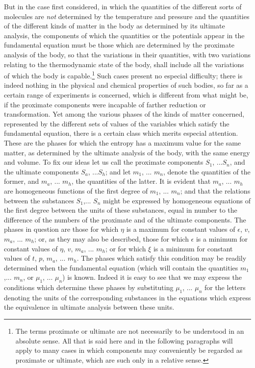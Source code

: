 \documentclass[12pt]{memoir}
\begin{document}
But in the case first considered, in which the quantities of the different sorts of molecules are \textit{not} determined by the temperature and pressure and the quantities of the different kinds of matter in the body as determined by its ultimate analysis, the components of which the quantities or the potentials appear in the fundamental equation must be those which are determined by the proximate analysis of the body, so that the variations in their quantities, with two variations relating to the thermodynamic state of the body, shall include all the variations of which the body is capable.\footnote{The terms proximate or ultimate are not necessarily to be understood in an absolute sense. All that is said here and in the following paragraphs will apply to many cases in which components may conveniently be regarded as proximate or ultimate, which are such only in a relative sense.} Such cases present no especial difficulty; there is indeed nothing in the physical and chemical properties of such bodies, so far as a certain range of experiments is concerned, which is different from what might be, if the proximate components were incapable of farther reduction or transformation. Yet among the various phases of the kinds of matter concerned, represented by the different sets of values of the variables which satisfy the fundamental equation, there is a certain class which merits especial attention. These are the phases for which the entropy has a maximum value for the same matter, as determined by the ultimate analysis of the body, with the same energy and volume. To fix our ideas let us call the proximate components $S_1$, ...$S_n$, and the ultimate components $S_a$, ...$S_h$; and let $m_1$, ... $m_n$, denote the quantities of the former, and $m_a$, ... $m_h$, the quantities of the latter. It is evident that $m_a$, ... $m_h$ are homogeneous functions of the first degree of $m_1$, ... $m_n$; and that the relations between the substances $S_1$,... $S_n$ might be expressed by homogeneous equations of the first degree between the units of these substances, equal in number to the difference of the numbers of the proximate and of the ultimate components. The phases in question are those for which $\eta$ is a maximum for constant values of $\epsilon$, $v$, $m
_a$, ... $m_h$; or, as they may also be described, those for which $\epsilon$ is a minimum for constant values of $\eta$, $v$, $m_a$, ... $m_h$; or for which $\xi$ is a minimum  for constant values of $t$, $p$, $m_a$, ... $m_h$. The phases which satisfy this condition may be readily determined when the fundamental equation (which will contain the quantities $m_1$,... $m_n$, or $\mu_1$, ... $\mu_n$) is known. Indeed it is easy to see that we may express the conditions which determine these phases by substituting  $\mu_1$, ... $\mu_n$ for the letters denoting the units of the corresponding substances in the equations which express the equivalence in ultimate analysis between these units.
\end{document}
